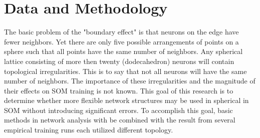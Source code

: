 \documentclass[11pt]{article}
\begin{document}



\section{Data and Methodology}
The basic problem of the "boundary effect" is that neurons on the edge have
fewer neighbors. Yet there are only five possible arrangements of points on a
sphere such that all points have the same number of neighbors.  Any spherical
lattice consisting of more then twenty (dodecahedron) neurons will contain
topological irregularities.  This is to say that not all neurons will have the
same number of neighbors.  The importance of these irregularities and the 
magnitude of their effects on SOM training is not known.  This goal of this research
is to determine whether more flexible network structures may be used in spherical 
in SOM without introducing significant errors. To accomplish this goal, basic methods 
in network analysis with be combined with the result from several empirical training
runs each utilized different topology.  
\end{document}
